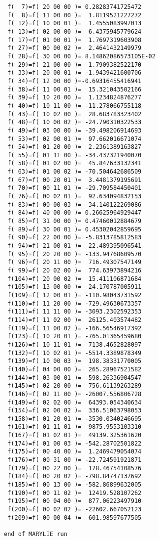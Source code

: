\begin{footnotesize}
\begin{verbatim}
 f(  7)=f( 20 00 00 )= 0.28283741725472
 f(  8)=f( 11 00 00 )=  1.8119521227272
 f( 12)=f( 10 00 01 )=  1.4555083997013
 f( 13)=f( 02 00 00 )=  6.4375945779624
 f( 17)=f( 01 00 01 )=  1.7697319603908
 f( 27)=f( 00 00 02 )=  2.4641432149979
 f( 28)=f( 30 00 00 )= 8.14862086573105E-02
 f( 29)=f( 21 00 00 )=  1.7909382522170
 f( 33)=f( 20 00 01 )= -1.9439421600706
 f( 34)=f( 12 00 00 )=-0.69316455416941
 f( 38)=f( 11 00 01 )=  15.321043502166
 f( 39)=f( 10 20 00 )=  1.1234824876277
 f( 40)=f( 10 11 00 )= -11.278066755118
 f( 43)=f( 10 02 00 )=  28.683783323402
 f( 48)=f( 10 00 02 )= -24.790310322533
 f( 49)=f( 03 00 00 )= -39.498206914693
 f( 53)=f( 02 00 01 )=  97.662016671074
 f( 54)=f( 01 20 00 )=  2.2361389163827
 f( 55)=f( 01 11 00 )= -34.437321940070
 f( 58)=f( 01 02 00 )=  45.847633132341
 f( 63)=f( 01 00 02 )= -70.504642686509
 f( 67)=f( 00 20 01 )=  3.4481379195691
 f( 70)=f( 00 11 01 )= -29.709584450401
 f( 76)=f( 00 02 01 )=  92.634094832153
 f( 83)=f( 00 00 03 )= -34.140122269086
 f( 84)=f( 40 00 00 )= 0.26625964929447
 f( 85)=f( 31 00 00 )= 0.47460012884679
 f( 89)=f( 30 00 01 )= 0.45302042859695
 f( 90)=f( 22 00 00 )= -5.8313785812583
 f( 94)=f( 21 00 01 )= -22.489395096541
 f( 95)=f( 20 20 00 )= -133.94768609570
 f( 96)=f( 20 11 00 )=  716.49307547149
 f( 99)=f( 20 02 00 )=  774.63973894216
 f(104)=f( 20 00 02 )=  15.411106871684
 f(105)=f( 13 00 00 )=  24.170787005911
 f(109)=f( 12 00 01 )= -110.98043731592
 f(110)=f( 11 20 00 )= -729.49630673357
 f(111)=f( 11 11 00 )= -3093.2302592353
 f(114)=f( 11 02 00 )=  26125.403574482
 f(119)=f( 11 00 02 )= -166.56546917392
 f(123)=f( 10 20 01 )= -765.01365459680
 f(126)=f( 10 11 01 )=  7138.4652828097
 f(132)=f( 10 02 01 )= -5514.3389878349
 f(139)=f( 10 00 03 )=  198.38331770005
 f(140)=f( 04 00 00 )=  265.28967521582
 f(144)=f( 03 00 01 )= -598.26336904547
 f(145)=f( 02 20 00 )=  756.61139263289
 f(146)=f( 02 11 00 )= -26007.556806728
 f(149)=f( 02 02 00 )=  64393.054340634
 f(154)=f( 02 00 02 )=  336.51063798053
 f(158)=f( 01 20 01 )= -3530.0340246695
 f(161)=f( 01 11 01 )=  9875.9553103310
 f(167)=f( 01 02 01 )=  49139.325361620
 f(174)=f( 01 00 03 )= -542.28702501822
 f(175)=f( 00 40 00 )=  1.2469479054074
 f(176)=f( 00 31 00 )= -22.724591921871
 f(179)=f( 00 22 00 )=  178.46754108576
 f(184)=f( 00 20 02 )= -798.84747137692
 f(185)=f( 00 13 00 )= -582.86899632005
 f(190)=f( 00 11 02 )=  12419.528107262
 f(195)=f( 00 04 00 )=  877.06223497910
 f(200)=f( 00 02 02 )= -22602.667052123
 f(209)=f( 00 00 04 )=  601.98597677505

end of MARYLIE run
\end{verbatim}
\end{footnotesize}

